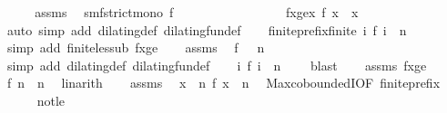 \begin{isabellebody}
%
\isadelimproof
%
\endisadelimproof
%
\isatagproof
{}\isamarkupfalse%
\ {\isacharminus}\isanewline
\ \ \isamarkupfalse%
\ assms{\isacharparenleft}{}{\isacharparenright}\ \isamarkupfalse%
\ smf{\isacharcolon}{\isacartoucheopen}strict{\isacharunderscore}mono\ f{\isacartoucheclose}\isanewline
\ \ \ \ \ \ \ \ \ \ \ \ \ \ \ \ \ fxge{\isacharcolon}{\isacartoucheopen}{\isasymforall}x{\isachardot}\ f\ x\ {\isasymge}\ x{\isacartoucheclose}\isanewline
\ \ \ \ \isamarkupfalse%
\ {\isacharparenleft}auto\ simp\ add{\isacharcolon}\ dilating{\isacharunderscore}def\ dilating{\isacharunderscore}fun{\isacharunderscore}def{\isacharparenright}\isanewline
\ \ \isamarkupfalse%
\ finite{\isacharunderscore}prefix{\isacharcolon}{\isacartoucheopen}finite\ {\isacharbraceleft}i{\isachardot}\ f\ i\ {\isasymle}\ n{\isacharbraceright}{\isacartoucheclose}\ \isamarkupfalse%
\ {\isacharparenleft}simp\ add{\isacharcolon}\ finite{\isacharunderscore}less{\isacharunderscore}ub\ fxge{\isacharparenright}\isanewline
\ \ \isamarkupfalse%
\ assms{\isacharparenleft}{}{\isacharparenright}\ \isamarkupfalse%
\ {\isacartoucheopen}f\ {}\ {\isasymle}\ n{\isacartoucheclose}\ \isamarkupfalse%
\ {\isacharparenleft}simp\ add{\isacharcolon}\ dilating{\isacharunderscore}def\ dilating{\isacharunderscore}fun{\isacharunderscore}def{\isacharparenright}\isanewline
\ \ \isamarkupfalse%
\ {\isacartoucheopen}{\isacharbraceleft}i{\isachardot}\ f\ i\ {\isasymle}\ n{\isacharbraceright}\ {\isasymnoteq}\ {\isacharbraceleft}{\isacharbraceright}{\isacartoucheclose}\ \isamarkupfalse%
\ blast\isanewline
\ \ \isamarkupfalse%
\ assms{\isacharparenleft}{}{\isacharparenright}\ fxge\ \isamarkupfalse%
\ {\isacartoucheopen}f\ n\ {\isacharless}\ n{\isacartoucheclose}\ \isamarkupfalse%
\ linarith\isanewline
\ \ \isamarkupfalse%
\ assms{\isacharparenleft}{}{\isacharparenright}\ \isamarkupfalse%
\ {\isacartoucheopen}{\isasymforall}x\ {\isachargreater}\ n\ f\ x\ {\isachargreater}\ n{\isacartoucheclose}\ \isamarkupfalse%
\ Max{\isachardot}coboundedI{\isacharbrackleft}OF\ finite{\isacharunderscore}prefix{\isacharbrackright}\isanewline
\ \ \ \ \isamarkupfalse%
\ not{\isacharunderscore}le\ \isamarkupfalse%

\end{isabellebody}
